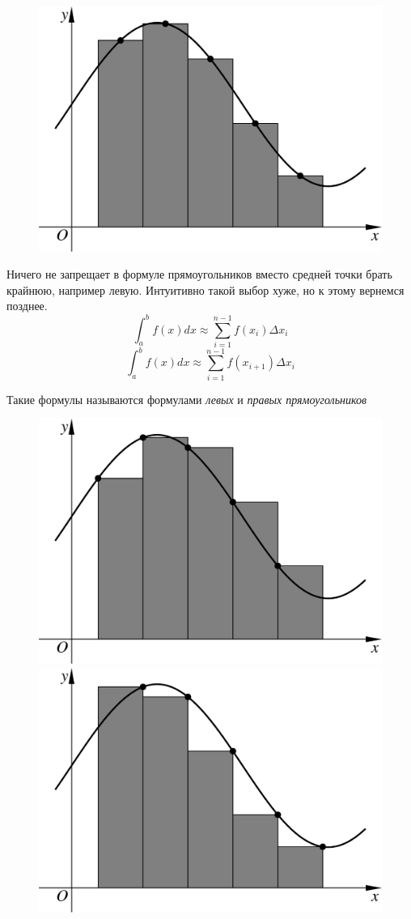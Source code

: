 \documentclass[professionalfonts,compress,unicode]{beamer}
\begin{document}
{
	\begin{figure}%
	\includegraphics[width=\columnwidth]{rect.pdf}%
	\end{figure}
}

{
	Ничего не запрещает в формуле прямоугольников вместо средней точки брать крайнюю, например левую.
	Интуитивно такой выбор хуже, но к этому вернемся позднее.
	$$
	\int_a^b f(x) dx \approx \sum_{i=1}^{n-1} f\left(x_i\right)\Delta x_i
	$$
	$$
	\int_a^b f(x) dx \approx \sum_{i=1}^{n-1} f\left(x_{i+1}\right)\Delta x_i
	$$
	
	\pause
	
	Такие формулы называются формулами \emph{левых} и \emph{правых прямоугольников}
}

{
	\begin{figure}%
	\includegraphics[width=.5\columnwidth]{lrect.pdf}%
	\includegraphics[width=.5\columnwidth]{rrect.pdf}%
	\end{figure}
}
\end{document}
